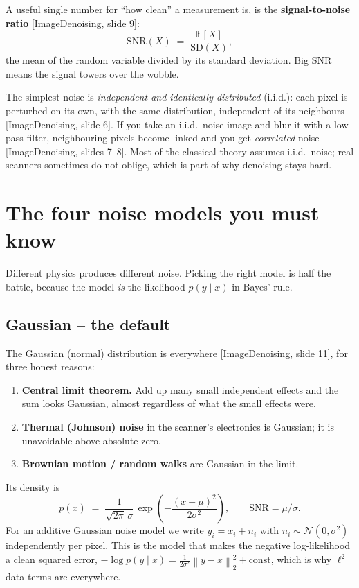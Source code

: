 \documentclass[11pt]{article}
\newcommand{\E}{\mathbb{E}}
\newcommand{\norm}[1]{\left\lVert #1 \right\rVert}
\newcommand{\deck}[1]{\textsf{\small[#1]}}
\begin{document}
A useful single number for ``how clean'' a measurement is, is the
\textbf{signal-to-noise ratio} \deck{ImageDenoising, slide 9}:
\[
\mathrm{SNR}(X) \;=\; \frac{\E[X]}{\mathrm{SD}(X)} ,
\]
the mean of the random variable divided by its standard deviation. Big SNR
means the signal towers over the wobble.

\begin{notebox}
The simplest noise is \emph{independent and identically distributed} (i.i.d.):
each pixel is perturbed on its own, with the same distribution, independent of
its neighbours \deck{ImageDenoising, slide 6}. If you take an i.i.d.\ noise
image and blur it with a low-pass filter, neighbouring pixels become linked and
you get \emph{correlated} noise \deck{ImageDenoising, slides 7--8}. Most of the
classical theory assumes i.i.d.\ noise; real scanners sometimes do not oblige,
which is part of why denoising stays hard.
\end{notebox}

\section{The four noise models you must know}

Different physics produces different noise. Picking the right model is half the
battle, because the model \emph{is} the likelihood $p(y\mid x)$ in Bayes' rule.

\subsection{Gaussian -- the default}

The Gaussian (normal) distribution is everywhere \deck{ImageDenoising, slide 11},
for three honest reasons:
\begin{enumerate}[nosep,leftmargin=*]
  \item \textbf{Central limit theorem.} Add up many small independent effects
  and the sum looks Gaussian, almost regardless of what the small effects were.
  \item \textbf{Thermal (Johnson) noise} in the scanner's electronics is
  Gaussian; it is unavoidable above absolute zero.
  \item \textbf{Brownian motion / random walks} are Gaussian in the limit.
\end{enumerate}
Its density is
\[
p(x) \;=\; \frac{1}{\sqrt{2\pi}\,\sigma}\,
           \exp\!\left(-\frac{(x-\mu)^2}{2\sigma^2}\right),
\qquad \mathrm{SNR} = \mu/\sigma .
\]
For an additive Gaussian noise model we write $y_i = x_i + n_i$ with
$n_i \sim \mathcal{N}(0,\sigma^2)$ independently per pixel. This is the model
that makes the negative log-likelihood a clean squared error,
$-\log p(y\mid x) = \tfrac{1}{2\sigma^2}\norm{y-x}_2^2 + \text{const}$, which is
why $\ell^2$ data terms are everywhere.
\end{document}
